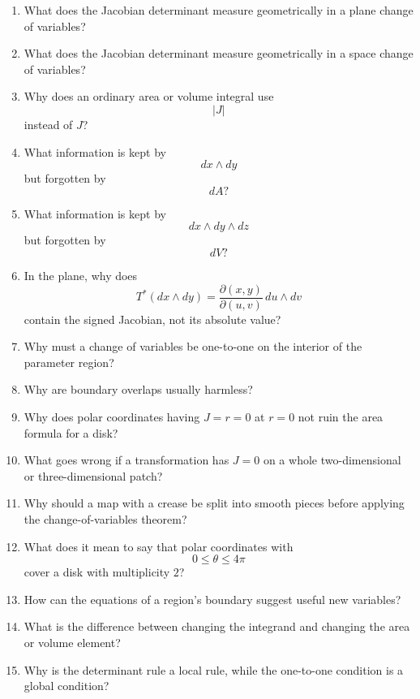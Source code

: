\begin{enumerate}
\item What does the Jacobian determinant measure geometrically in a plane change of
variables?

\item What does the Jacobian determinant measure geometrically in a space change of
variables?

\item Why does an ordinary area or volume integral use
\[
    |J|
\]
instead of \(J\)?

\item What information is kept by
\[
    dx\wedge dy
\]
but forgotten by
\[
    dA?
\]

\item What information is kept by
\[
    dx\wedge dy\wedge dz
\]
but forgotten by
\[
    dV?
\]

\item In the plane, why does
\[
    T^*(dx\wedge dy)
    =
    \frac{\partial(x,y)}{\partial(u,v)}\,du\wedge dv
\]
contain the signed Jacobian, not its absolute value?

\item Why must a change of variables be one-to-one on the interior of the parameter
region?

\item Why are boundary overlaps usually harmless?

\item Why does polar coordinates having \(J=r=0\) at \(r=0\) not ruin the area formula
for a disk?

\item What goes wrong if a transformation has \(J=0\) on a whole two-dimensional or
three-dimensional patch?

\item Why should a map with a crease be split into smooth pieces before applying the
change-of-variables theorem?

\item What does it mean to say that polar coordinates with
\[
    0\le\theta\le4\pi
\]
cover a disk with multiplicity \(2\)?

\item How can the equations of a region's boundary suggest useful new variables?

\item What is the difference between changing the integrand and changing the area or
volume element?

\item Why is the determinant rule a local rule, while the one-to-one condition is a global
condition?
\end{enumerate}


